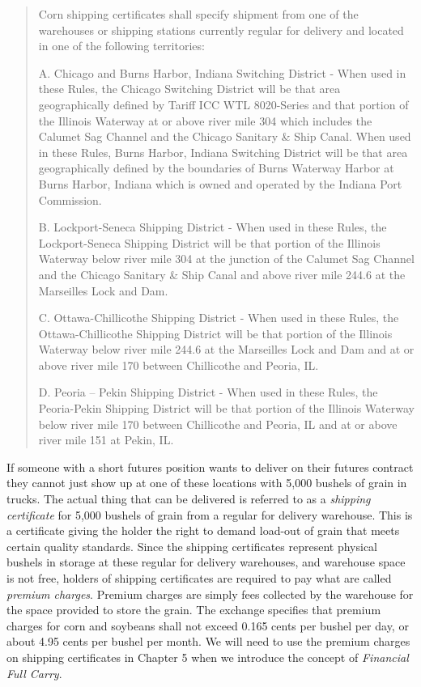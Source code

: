 \documentclass[
]{book}
\begin{document}
\begin{quote}
Corn shipping certificates shall specify shipment from one of the warehouses or shipping stations currently regular for delivery and located in one of the following territories:

A. Chicago and Burns Harbor, Indiana Switching District - When used in these Rules, the Chicago Switching District will be that area geographically defined by Tariff ICC WTL 8020-Series and that portion of the Illinois Waterway at or above river mile 304 which includes the Calumet Sag Channel and the Chicago Sanitary \& Ship Canal. When used in these Rules, Burns Harbor, Indiana Switching District will be that area geographically defined by the boundaries of Burns Waterway Harbor at Burns Harbor, Indiana which is owned and operated by the Indiana Port Commission.

B. Lockport-Seneca Shipping District - When used in these Rules, the Lockport-Seneca Shipping District will be that portion of the Illinois Waterway below river mile 304 at the junction of the Calumet Sag Channel and the Chicago Sanitary \& Ship Canal and above river mile 244.6 at the Marseilles Lock and Dam.

C. Ottawa-Chillicothe Shipping District - When used in these Rules, the Ottawa-Chillicothe Shipping District will be that portion of the Illinois Waterway below river mile 244.6 at the Marseilles Lock and Dam and at or above river mile 170 between Chillicothe and Peoria, IL.

D. Peoria -- Pekin Shipping District - When used in these Rules, the Peoria-Pekin Shipping District will be that portion of the Illinois Waterway below river mile 170 between Chillicothe and Peoria, IL and at or above river mile 151 at Pekin, IL.
\end{quote}

If someone with a short futures position wants to deliver on their futures contract they cannot just show up at one of these locations with 5,000 bushels of grain in trucks. The actual thing that can be delivered is referred to as a \emph{shipping certificate} for 5,000 bushels of grain from a regular for delivery warehouse. This is a certificate giving the holder the right to demand load-out of grain that meets certain quality standards. Since the shipping certificates represent physical bushels in storage at these regular for delivery warehouses, and warehouse space is not free, holders of shipping certificates are required to pay what are called \emph{premium charges}. Premium charges are simply fees collected by the warehouse for the space provided to store the grain. The exchange specifies that premium charges for corn and soybeans shall not exceed 0.165 cents per bushel per day, or about 4.95 cents per bushel per month. We will need to use the premium charges on shipping certificates in Chapter 5 when we introduce the concept of \emph{Financial Full Carry}.
\end{document}
